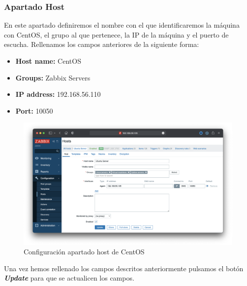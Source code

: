 \subsubsection{Apartado Host}
En este apartado definiremos el nombre con el que identificaremos la máquina con CentOS, el grupo al que pertenece, la IP de la máquina y el puerto de escucha. Rellenamos los campos anteriores de la siguiente forma:
    \begin{itemize}
        \item \textbf{Host name:} CentOS
        \item \textbf{Groups:} Zabbix Servers
        \item \textbf{IP address:} 192.168.56.110
        \item \textbf{Port:} 10050
    \end{itemize}
    \begin{figure}[H]
        \centering
        \includegraphics[scale=0.35]{images/centos_conf.png}
        \caption{Configuración apartado host de CentOS}
        \label{fig:centos_conf}
    \end{figure}
Una vez hemos rellenado los campos descritos anteriormente pulsamos el botón \textbf{\emph{Update}} para que se actualicen los campos.

